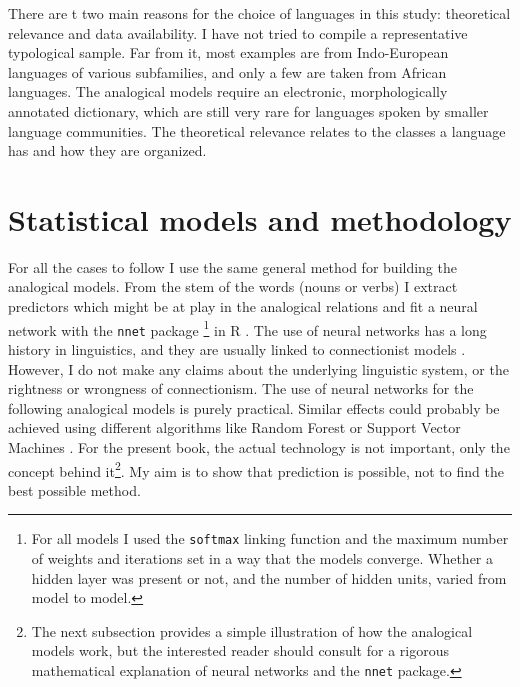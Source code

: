 There are t two main reasons for the choice of languages in this study: theoretical relevance and data availability. I have not tried to compile a  representative typological sample. Far from it, most examples are from Indo-European languages of various subfamilies, and only a few are taken from African languages. The analogical models require an electronic, morphologically annotated dictionary, which are still very rare for languages spoken by smaller language communities. The theoretical relevance relates to the classes a language has and how they are organized.

\section{Statistical models and methodology}

For all the cases to follow I use the same general method for building the analogical models. From the stem of the words (nouns or verbs) I extract predictors which might be at play in the analogical relations and fit a neural network with the \texttt{nnet} package \autocite{Venables.2002}\footnote{For all models I used the \texttt{softmax} linking function and the maximum number of weights and iterations set in a way that the models converge. Whether a hidden layer was present or not, and the number of hidden units, varied from model to model.} in R \autocite{RDevelopmentCoreTeam.2008}. The use of neural networks has a long history in linguistics, and they are usually linked to connectionist models \autocite{Bechtel.2002, Churchland.1989, McClelland.1986, Rumelhart.1986}. However, I do not make any claims about the underlying linguistic system, or the rightness or wrongness of connectionism. The use of neural networks for the following analogical models is purely practical. Similar effects could probably be achieved using different algorithms like Random Forest \autocite{Breiman.2001a} or Support Vector Machines \autocites{Smola.1998, Scholkopf.2001}. For the present book, the actual technology is not important, only the concept behind it\footnote{The next subsection provides a simple illustration of how the analogical models work, but the interested reader should consult \textcite{Venables.2002} for a rigorous mathematical explanation of neural networks and the \texttt{nnet} package.}. My aim is to show that prediction is possible, not to find the best possible method.

